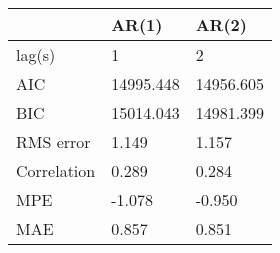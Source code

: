 \begin{tabular}{lll}
\toprule
{} &      AR(1) &      AR(2) \\
\midrule
lag(s)      &          1 &          2 \\
AIC         &  14995.448 &  14956.605 \\
BIC         &  15014.043 &  14981.399 \\
RMS error   &      1.149 &      1.157 \\
Correlation &      0.289 &      0.284 \\
MPE         &     -1.078 &     -0.950 \\
MAE         &      0.857 &      0.851 \\
\bottomrule
\end{tabular}
